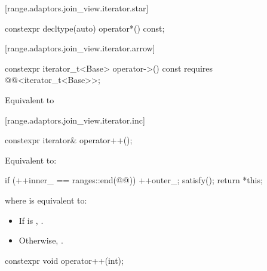 {[range.adaptors.join_view.iterator.star]{}

\begin{itemdecl}
constexpr decltype(auto) operator*() const;
\end{itemdecl}

\begin{itemdescr}
\pnum
\oldtxt{\returns} 
\end{itemdescr}

{\color{newclr}
[range.adaptors.join_view.iterator.arrow]{}

\begin{itemdecl}
constexpr iterator_t<Base> operator->() const
  requires @@<iterator_t<Base>>;
\end{itemdecl}

\begin{itemdescr}
\pnum
\effects Equivalent to 
\end{itemdescr}
} %

[range.adaptors.join_view.iterator.inc]{}

\begin{itemdecl}
constexpr iterator& operator++();
\end{itemdecl}

\begin{itemdescr}
\pnum
\effects Equivalent to:
\begin{codeblock}
if (++inner_ == ranges::end(@@)) {
  ++outer_;
  satisfy();
}
return *this;
\end{codeblock}

where  is equivalent to:
\begin{itemize}
\item If  is , .
\item Otherwise, .
\end{itemize}
\end{itemdescr}

\begin{itemdecl}
constexpr void operator++(int);
\end{itemdecl}

}
